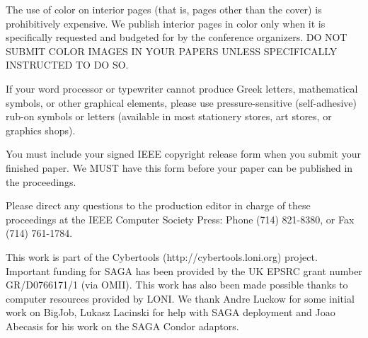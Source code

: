 \documentclass[times, 10pt,twocolumn]{article}
\begin{document}

The use of color on interior pages (that is, pages other
than the cover) is prohibitively expensive. We publish interior pages in 
color only when it is specifically requested and budgeted for by the 
conference organizers. DO NOT SUBMIT COLOR IMAGES IN YOUR 
PAPERS UNLESS SPECIFICALLY INSTRUCTED TO DO SO.


If your word processor or typewriter cannot produce Greek letters, 
mathematical symbols, or other graphical elements, please use 
pressure-sensitive (self-adhesive) rub-on symbols or letters (available 
in most stationery stores, art stores, or graphics shops).


You must include your signed IEEE copyright release form when you submit 
your finished paper. We MUST have this form before your paper can be 
published in the proceedings.


Please direct any questions to the production editor in charge of these 
proceedings at the IEEE Computer Society Press: Phone (714) 821-8380, or 
Fax (714) 761-1784.

This work is part of the Cybertools (http://cybertools.loni.org) project. Important funding for SAGA has been provided by the UK EPSRC grant number GR/D0766171/1 (via OMII).  This work has also been made possible thanks to computer resources provided by LONI.  We thank Andre Luckow for some initial work on BigJob, Lukasz Lacinski for help with SAGA deployment and Joao Abecasis for his work on the SAGA Condor adaptors.

\nocite{ex1,ex2}


\end{document}
